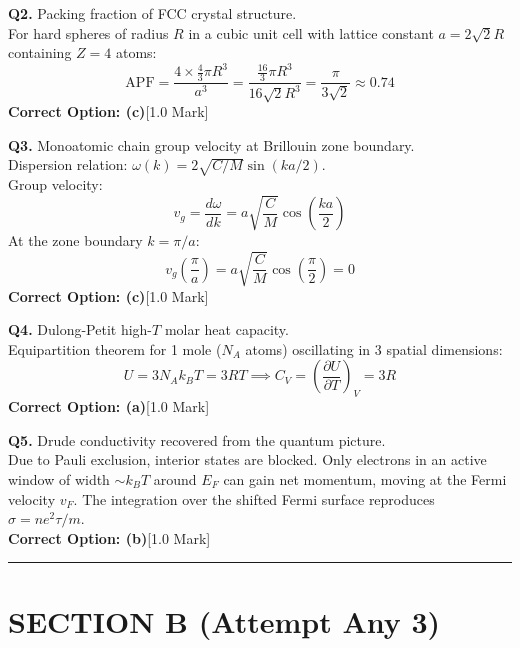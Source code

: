 \documentclass[10pt,a4paper,twocolumn]{article}
\begin{document}
\vspace{0.4em}
\textbf{Q2.} Packing fraction of FCC crystal structure.\\[2pt]
For hard spheres of radius $R$ in a cubic unit cell with lattice constant $a = 2\sqrt{2}R$ containing $Z = 4$ atoms:
$$\text{APF} = \frac{4 \times \frac{4}{3}\pi R^3}{a^3} = \frac{\frac{16}{3}\pi R^3}{16\sqrt{2}R^3} = \frac{\pi}{3\sqrt{2}} \approx 0.74$$
\textbf{Correct Option: (c)}\hfill [1.0 Mark]

\vspace{0.4em}
\textbf{Q3.} Monoatomic chain group velocity at Brillouin zone boundary.\\[2pt]
Dispersion relation: $\omega(k) = 2\sqrt{C/M}\sin(ka/2)$.\\
Group velocity:
$$v_g = \frac{d\omega}{dk} = a\sqrt{\frac{C}{M}}\cos\left(\frac{ka}{2}\right)$$
At the zone boundary $k = \pi/a$:
$$v_g\left(\frac{\pi}{a}\right) = a\sqrt{\frac{C}{M}}\cos\left(\frac{\pi}{2}\right) = 0$$
\textbf{Correct Option: (c)}\hfill [1.0 Mark]

\vspace{0.4em}
\textbf{Q4.} Dulong-Petit high-$T$ molar heat capacity.\\[2pt]
Equipartition theorem for 1 mole ($N_A$ atoms) oscillating in 3 spatial dimensions:
$$U = 3 N_A k_B T = 3 R T \implies C_V = \left(\frac{\partial U}{\partial T}\right)_V = 3R$$
\textbf{Correct Option: (a)}\hfill [1.0 Mark]

\vspace{0.4em}
\textbf{Q5.} Drude conductivity recovered from the quantum picture.\\[2pt]
Due to Pauli exclusion, interior states are blocked. Only electrons in an active window of width $\sim k_B T$ around $E_F$ can gain net momentum, moving at the Fermi velocity $v_F$. The integration over the shifted Fermi surface reproduces $\sigma = ne^2\tau/m$.\\[2pt]
\textbf{Correct Option: (b)}\hfill [1.0 Mark]

\vspace{-0.3em}
\hrule
\vspace{0.6em}

\section*{SECTION B (Attempt Any 3)}
\end{document}
